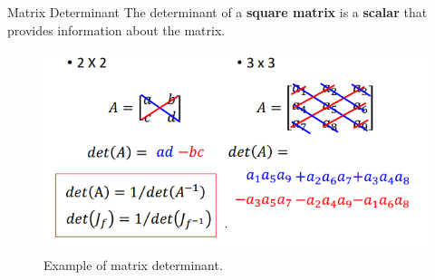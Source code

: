 \begin{frame}{Matrix Determinant}
The determinant of a \textbf{square matrix} is a \textbf{scalar} that provides information about the matrix.
\begin{figure}
    \centering
    \includegraphics[height=0.8\textheight, width=\textwidth, keepaspectratio]{images/norm-flow/determinant.png}
    \caption*{Example of matrix determinant.}
\end{figure}
    
\end{frame}